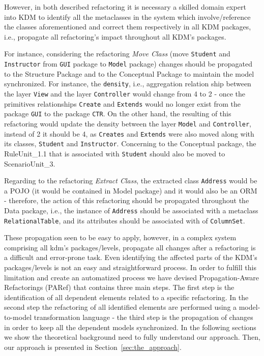 However, in both described refactoring it is necessary a skilled domain expert into KDM to identify all the metaclasses in the system which involve/reference the classes aforementioned and correct them respectively in all KDM packages, i.e., propagate all refactoring's impact throughout all KDM's packages. 

For instance, considering the refactoring \textit{Move Class} (move \texttt{Student} and \texttt{Instructor} from \texttt{GUI} package to \texttt{Model} package) changes should be propagated to the Structure Package and to the Conceptual Package to maintain the model synchronized. For instance, the \texttt{density}, i.e., aggregation relation ship between the layer \texttt{View} and the layer \texttt{Controller} would change from 4 to 2 - once the primitives relationships \texttt{Create} and \texttt{Extends} would no longer exist from the package \texttt{GUI} to the package \texttt{CTR}. On the other hand, the resulting of this refactoring would update the density between the layer \texttt{Model} and \texttt{Controller}, instead of 2 it should be 4, as \texttt{Creates} and \texttt{Extends} were also moved along with its classes, \texttt{Student} and \texttt{Instructor}. Concerning to the Conceptual package, the  RuleUnit\_1.1 that is associated with \texttt{Student} should also be moved to ScenarioUnit\_3. 

Regarding to the refactoring \textit{Extract Class}, the extracted class \texttt{Address} would be a POJO (it would be contained in Model package) and it would also be an ORM - therefore, the action of this refactoring should be propagated throughout  the Data package, i.e., the instance of \texttt{Address} should be associated with a metaclass \texttt{RelationalTable}, and its attributes should be associated with  of \texttt{ColumnSet}.


These propagation seen to be easy to apply, however, in a complex system comprising all kdm's packages/levels, propagate all changes after a refactoring is a difficult and error-prone task. Even identifying the affected parts of the KDM's packages/levels is not an easy and straightforward process. In order to fulfill this limitation and create an automatized process we have devised Propagation-Aware Refactorings (PARef) that contains three main steps. The first step is the identification of all dependent elements related to a specific refactoring. In the second step the refactoring of all identified elements are performed using a model-to-model transformation language - the third step is the propagation of changes in order to keep all the dependent models synchronized. %
In the following sections we show the theoretical background need to fully understand our approach. Then, our approach is presented in Section~\ref{sec:the_approach}.


